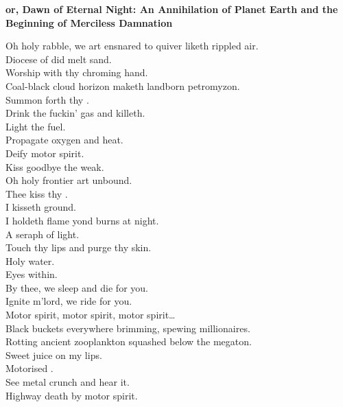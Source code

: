 
\vspace*{-.5\baselineskip}%
\textbf{or, Dawn of Eternal Night: An Annihilation of Planet Earth and the Beginning of Merciless Damnation}

\label{album:petrodragonic-apocalypse}



Oh holy rabble, we art ensnared to quiver liketh rippled air. \\
Diocese of did melt sand. \\
Worship with thy chroming hand. \\
Coal-black cloud horizon maketh landborn petromyzon. \\
Summon forth thy . \\
Drink the fuckin' gas and killeth. \\

Light the fuel. \\
Propagate oxygen and heat. \\
Deify motor spirit. \\
Kiss goodbye the weak. \\

Oh holy frontier art unbound. \\
Thee kiss thy . \\
I kisseth ground. \\
I holdeth flame yond burns at night. \\
A seraph of  light. \\
Touch thy lips and purge thy skin. \\
Holy water. \\
Eyes within. \\
By thee, we sleep and die for you. \\
Ignite m'lord, we ride for you. \\

Motor spirit, motor spirit, motor spirit… \\

Black buckets everywhere brimming, spewing millionaires. \\
Rotting ancient zooplankton squashed below the megaton. \\
Sweet juice on my lips. \\
Motorised . \\
See metal crunch and hear it. \\
Highway death by motor spirit. \\

